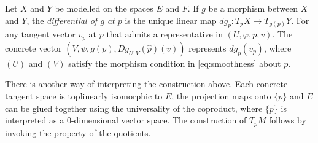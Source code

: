 \documentclass[../main-manifolds.tex]{subfiles}
\begin{document}
\begin{definition}
    Let $X$ and $Y$ be modelled on the spaces $E$ and $F$. If $g$ be a morphism between $X$ and $Y$, the \emph{differential of $g$ at $p$} is the unique linear map $dg_p: T_p X\to T_{g(p)} Y$. For any tangent vector $v_p$ at $p$ that admits a representative in $(U,\varphi,p,v)$. The concrete vector $(V,\psi,g(p), Dg_{U,V}(\hat{p})(v))$ represents $dg_p(v_p)$, where $(U)$ and $(V)$ satisfy the morphism condition in \cref{eq:smoothness} about $p$.
\end{definition}
\begin{note}
    There is another way of interpreting the construction above. Each concrete tangent space is toplinearly isomorphic to $E$, the projection maps onto $\{p\}$ and $E$ can be glued together using the universality of the coproduct, where $\{p\}$ is interpreted as a $0$-dimensional vector space. The construction of $T_pM$ follows by invoking the property of the quotients.
\end{note}





\end{document}
